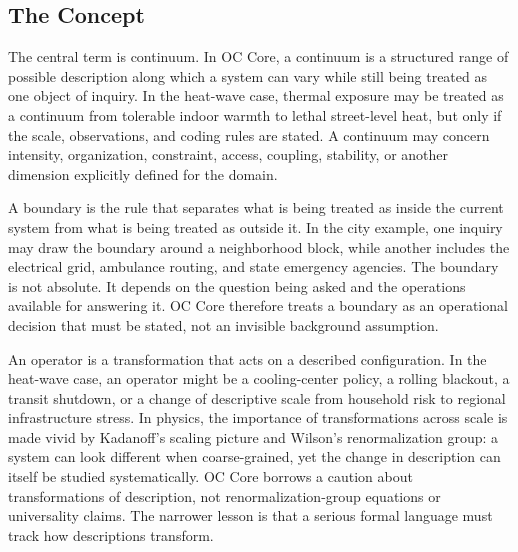 \documentclass[11pt,a4paper,openany]{book}
\begin{document}
\subsection{The Concept}
The central term is continuum. In OC Core, a continuum is a structured range of possible description along which a system can vary while still being treated as one object of inquiry. In the heat-wave case, thermal exposure may be treated as a continuum from tolerable indoor warmth to lethal street-level heat, but only if the scale, observations, and coding rules are stated. A continuum may concern intensity, organization, constraint, access, coupling, stability, or another dimension explicitly defined for the domain. \cite{kadanoff_scaling,wilson_renormalization}\par
A boundary is the rule that separates what is being treated as inside the current system from what is being treated as outside it. In the city example, one inquiry may draw the boundary around a neighborhood block, while another includes the electrical grid, ambulance routing, and state emergency agencies. The boundary is not absolute. It depends on the question being asked and the operations available for answering it. OC Core therefore treats a boundary as an operational decision that must be stated, not an invisible background assumption.\par
An operator is a transformation that acts on a described configuration. In the heat-wave case, an operator might be a cooling-center policy, a rolling blackout, a transit shutdown, or a change of descriptive scale from household risk to regional infrastructure stress. In physics, the importance of transformations across scale is made vivid by Kadanoff's scaling picture and Wilson's renormalization group: a system can look different when coarse-grained, yet the change in description can itself be studied systematically. OC Core borrows a caution about transformations of description, not renormalization-group equations or universality claims. The narrower lesson is that a serious formal language must track how descriptions transform.\par
\end{document}
